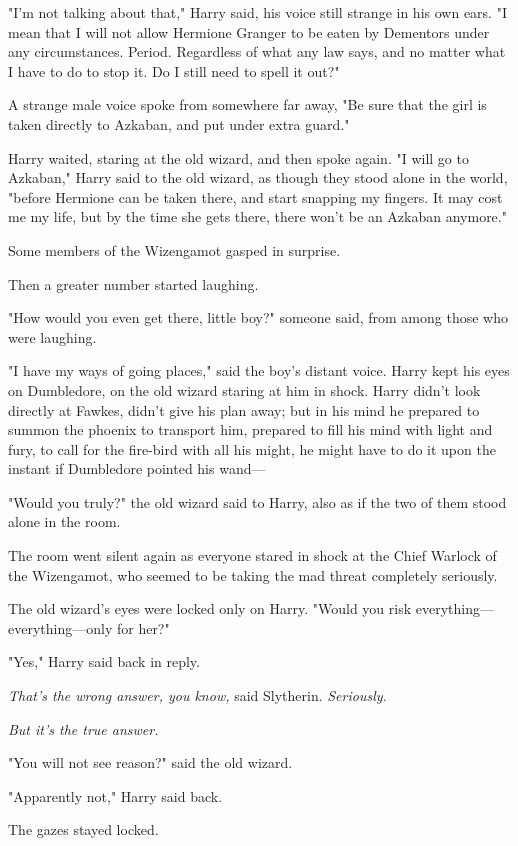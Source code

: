 "I'm not talking about that," Harry said, his voice still strange in his own 
ears. "I mean that I will not allow Hermione Granger to be eaten by Dementors 
under any circumstances. Period. Regardless of what any law says, and no matter 
what I have to do to stop it. Do I still need to spell it out?"

A strange male voice spoke from somewhere far away, "Be sure that the girl is 
taken directly to Azkaban, and put under extra guard."

Harry waited, staring at the old wizard, and then spoke again. "I will go to 
Azkaban," Harry said to the old wizard, as though they stood alone in the 
world, "before Hermione can be taken there, and start snapping my fingers. It 
may cost me my life, but by the time she gets there, there won't be an Azkaban 
anymore."

Some members of the Wizengamot gasped in surprise.

Then a greater number started laughing.

"How would you even get there, little boy?" someone said, from among those who 
were laughing.

"I have my ways of going places," said the boy's distant voice. Harry kept his 
eyes on Dumbledore, on the old wizard staring at him in shock. Harry didn't 
look directly at Fawkes, didn't give his plan away; but in his mind he prepared 
to summon the phoenix to transport him, prepared to fill his mind with light 
and fury, to call for the fire-bird with all his might, he might have to do it 
upon the instant if Dumbledore pointed his wand---

"Would you truly?" the old wizard said to Harry, also as if the two of them 
stood alone in the room.

The room went silent again as everyone stared in shock at the Chief Warlock of 
the Wizengamot, who seemed to be taking the mad threat completely seriously.

The old wizard's eyes were locked only on Harry. "Would you risk 
everything---everything---only for her?"

"Yes," Harry said back in reply.

\emph{That's the wrong answer, you know,} said Slytherin. \emph{Seriously.}

\emph{But it's the true answer.}

"You will not see reason?" said the old wizard.

"Apparently not," Harry said back.

The gazes stayed locked.

